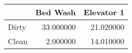 \begin{tabular}{lrr}
\toprule
 & Bed Wash & Elevator 1 \\
\midrule
Dirty & 33.000000 & 21.020000 \\
Clean & 2.000000 & 14.010000 \\
\bottomrule
\end{tabular}
